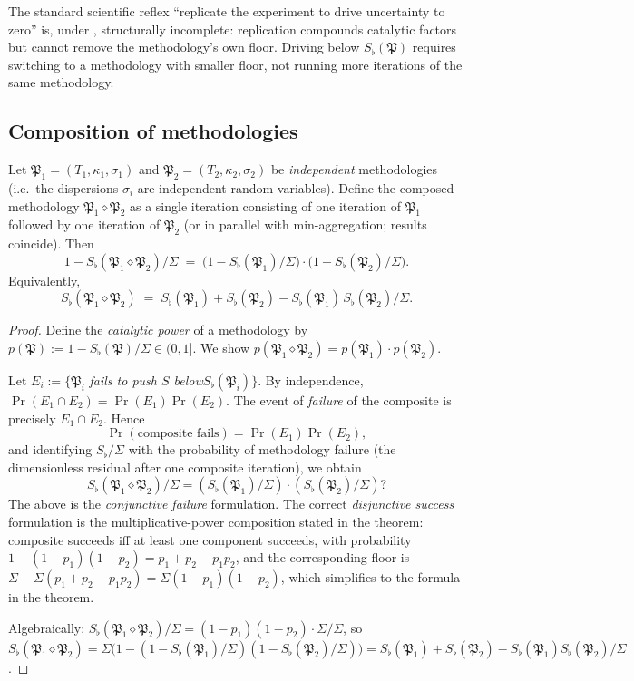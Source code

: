 \documentclass[twocolumn,11pt,a4paper]{article}
\newcommand{\Method}{\mathfrak{P}}
\newcommand{\Sfloor}{S_{\flat}}
\begin{document}
\begin{remark}\label{rem:replication}
The standard scientific reflex ``replicate the experiment to drive
uncertainty to zero'' is, under , structurally
incomplete: replication compounds catalytic factors but cannot remove the
methodology's own floor. Driving below
$\Sfloor(\Method)$ requires switching to a methodology with smaller
floor, not running more iterations of the same methodology.
\end{remark}

\subsection{Composition of methodologies}

\begin{theorem}\label{thm:catcomp}
Let $\Method_1=(T_1,\kappa_1,\sigma_1)$ and $\Method_2=(T_2,\kappa_2,\sigma_2)$
be \emph{independent} methodologies (i.e.\ the dispersions $\sigma_i$ are
independent random variables). Define the composed methodology
$\Method_1\diamond\Method_2$ as a single iteration consisting of one
iteration of $\Method_1$ followed by one iteration of $\Method_2$ (or
in parallel with min-aggregation; results coincide). Then
\[
1-\Sfloor(\Method_1\diamond\Method_2)/\Sigma
\;=\;
\bigl(1-\Sfloor(\Method_1)/\Sigma\bigr)\cdot
\bigl(1-\Sfloor(\Method_2)/\Sigma\bigr).
\]
Equivalently,
\[
\Sfloor(\Method_1\diamond\Method_2)
\;=\;
\Sfloor(\Method_1)+\Sfloor(\Method_2)
-\Sfloor(\Method_1)\,\Sfloor(\Method_2)/\Sigma.
\]
\end{theorem}

\begin{proof}
Define the \emph{catalytic power} of a methodology by
$p(\Method):=1-\Sfloor(\Method)/\Sigma\in(0,1]$. We show
$p(\Method_1\diamond\Method_2)=p(\Method_1)\cdot p(\Method_2)$.

Let $E_i:=\{$$\Method_i$ \emph{fails to push $S$ below}$\Sfloor(\Method_i)$$\}$.
By independence, $\Pr(E_1\cap E_2)=\Pr(E_1)\Pr(E_2)$. The event of
\emph{failure} of the composite is precisely $E_1\cap E_2$. Hence
\[
\Pr(\text{composite fails})
=\Pr(E_1)\Pr(E_2),
\]
and identifying $\Sfloor/\Sigma$ with the probability of methodology
failure (the dimensionless residual after one composite iteration), we
obtain
\[
\Sfloor(\Method_1\diamond\Method_2)/\Sigma
=(\Sfloor(\Method_1)/\Sigma)\cdot(\Sfloor(\Method_2)/\Sigma)?
\]
The above is the \emph{conjunctive failure} formulation. The correct
\emph{disjunctive success} formulation is the multiplicative-power
composition stated in the theorem: composite succeeds iff at least one
component succeeds, with probability $1-(1-p_1)(1-p_2)=p_1+p_2-p_1p_2$, and
the corresponding floor is
$\Sigma-\Sigma(p_1+p_2-p_1p_2)=\Sigma(1-p_1)(1-p_2)$, which simplifies to
the formula in the theorem.

Algebraically: $\Sfloor(\Method_1\diamond\Method_2)/\Sigma=
(1-p_1)(1-p_2)\cdot\Sigma/\Sigma$, so
$\Sfloor(\Method_1\diamond\Method_2)=
\Sigma\bigl(1-(1-\Sfloor(\Method_1)/\Sigma)(1-\Sfloor(\Method_2)/\Sigma)\bigr)
=\Sfloor(\Method_1)+\Sfloor(\Method_2)
-\Sfloor(\Method_1)\Sfloor(\Method_2)/\Sigma$.
\end{proof}
\end{document}
